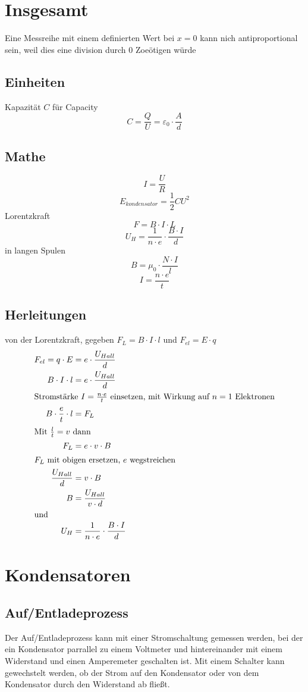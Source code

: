\documentclass{article}
\begin{document}
 
\section{Insgesamt}
Eine Messreihe mit einem definierten Wert bei $x=0$ kann nich antiproportional sein, weil dies eine division durch 0 Zoeötigen würde 
 
\subsection{Einheiten}
\noindent Kapazität $C$ für Capacity
\[C=\frac{Q}{U}=\varepsilon_0 \cdot \frac{A}{d}\]
 
\subsection{Mathe} 
\[I=\frac{U}{R}\]
\[E_{kondensator}=\frac{1}{2}CU^2\]
Lorentzkraft 
\[F=B \cdot I \cdot L\] 
\[U_H=\frac{1}{n \cdot e} \cdot \frac{B \cdot I}{d}\]
in langen Spulen 
\[B=\mu_0 \cdot \frac{N \cdot I}{l}\]
\[I = \frac{n \cdot e}{t}\] 
 
\subsection{Herleitungen}
von der Lorentzkraft, gegeben $F_L=B \cdot I \cdot l$ und $F_{el} = E \cdot q$ 
\begin{align}
F_{el} = q \cdot E &= e \cdot \frac{U_{Hall}}{d} \\
B \cdot I \cdot l &= e \cdot \frac{U_{Hall}}{d} \\
\intertext{Stromstärke $I = \frac{n \cdot e}{t}$ einsetzen, mit Wirkung auf $n=1$ Elektronen}
B \cdot \frac{e}{t} \cdot l &= F_L \\
\intertext{Mit $\frac{l}{t} = v$ dann}
F_L &= e \cdot v \cdot B \\
\intertext{$F_L$ mit obigen ersetzen, $e$ wegstreichen}
\frac{U_{Hall}}{d} &= v \cdot B \\
B &= \frac{U_{Hall}}{v \cdot d} \\
\intertext{und}
U_H &= \frac{1}{n \cdot e} \cdot \frac{B \cdot I}{d} 
\end{align} 
 
\section{Kondensatoren}  
\subsection{Auf/Entladeprozess}
Der Auf/Entladeprozess kann mit einer Stromschaltung gemessen werden, bei der ein Kondensator parrallel zu einem Voltmeter und hintereinander mit einem Widerstand und einen Amperemeter geschalten ist. Mit einem Schalter kann gewechstelt werden, ob der Strom auf den Kondensator oder von dem Kondensator durch den Widerstand ab fließt. 
 
\end{document}
